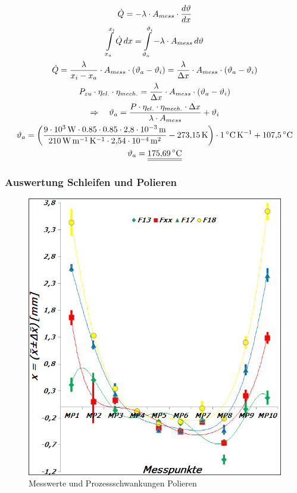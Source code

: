 \documentclass[12pt,a4paper,parskip]{scrartcl}
\begin{document}
\begin{gather}
\dot{Q} = - \lambda \cdot A_{mess} \cdot \frac{d\vartheta}{dx}\\
\int\limits_{x_a}^{x_i} \dot{Q}\,dx = \int\limits_{\vartheta_a}^{\vartheta_i} - \lambda \cdot A_{mess}\,d\vartheta\\
\dot{Q} = \frac{\lambda}{x_i - x_a} \cdot A_{mess} \cdot (\vartheta_a - \vartheta_i) = \frac{\lambda}{\Delta x} \cdot A_{mess} \cdot (\vartheta_a - \vartheta_i)\\
P_{zu} \cdot \eta_{el.} \cdot \eta_{mech.} = \frac{\lambda}{\Delta x} \cdot A_{mess} \cdot (\vartheta_a - \vartheta_i)\\
\Rightarrow \quad  \vartheta_a = \frac{P \cdot \eta_{el.} \cdot \eta_{mech.} \cdot \Delta x}{\lambda \cdot A_{mess}} + \vartheta_i \\
\vartheta_a = \left(\frac{\SI{9e3}{\watt} \cdot 0.85 \cdot 0.85 \cdot \SI{2.8e-3}{\meter}}{\SI{210}{\watt\per\meter\per\kelvin} \cdot \SI{2.54e-4}{\meter\squared}}- \SI{273.15}{\kelvin}\right) \cdot \SI{1}{\degreeCelsius\per\kelvin} + \SI{107.5}{\degreeCelsius} \notag\\
\vartheta_a = \underline{\underline{\SI{175.69}{\degreeCelsius}}} \notag
\end{gather}

\subsubsection{Auswertung Schleifen und Polieren }

\begin{figure}[hbtp]
\centering
\includegraphics[width=.8\textwidth]{diagrammpolier}
\caption{Messwerte und Prozessschwankungen Polieren}
\end{figure}
\end{document}
